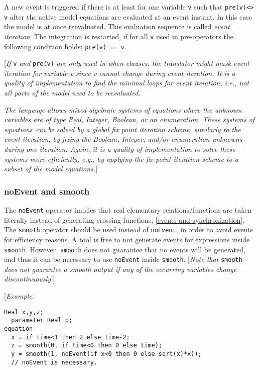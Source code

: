 A new event is triggered if there is at least for one variable \lstinline!v! such that \lstinline!pre(v)<> v! after the active model equations are
evaluated at an event instant. In this case the model is at once
reevaluated. This evaluation sequence is called \emph{event
iteration}. The integration is restarted, if for all \lstinline!v! used in
pre-operators the following condition holds: \lstinline!pre(v) == v!.

{[}\emph{If} \lstinline!v! \emph{and} \lstinline!pre(v)! \emph{are only used in when-clauses,
the translator might mask event iteration for variable v since v cannot
change during event iteration. It is a \emph{quality of implementation} to
find the minimal loops for event iteration, i.e., not all parts of the
model need to be reevaluated. }

\emph{The language allows mixed algebraic systems of equations where the
unknown variables are of type Real, Integer, Boolean, or an enumeration.
These systems of equations can be solved by a global fix point iteration
scheme, similarly to the event iteration, by fixing the Boolean,
Integer, and/or enumeration unknowns during one iteration. Again, it is
a quality of implementation to solve these systems more efficiently,
e.g., by applying the fix point iteration scheme to a subset of the
model equations.}{]}

\subsubsection{noEvent and smooth}

The \lstinline!noEvent! operator implies that real elementary relations/functions
are taken literally instead of generating crossing functions, \autoref{events-and-synchronization}.
The \lstinline!smooth! operator should be used instead of \lstinline!noEvent!, in order to
avoid events for efficiency reasons. A tool is free to not generate
events for expressions inside \lstinline!smooth!. However, \lstinline!smooth! does not guarantee
that no events will be generated, and thus it can be necessary to use
\lstinline!noEvent! inside \lstinline!smooth!. {[}\emph{Note that} \lstinline!smooth! \emph{does not
guarantee a smooth output if any of the occurring variables change
discontinuously.}{]}

{[}\emph{Example}:
\begin{lstlisting}[language=modelica]
  Real x,y,z;
  parameter Real p;
equation
  x = if time<1 then 2 else time-2;
  z = smooth(0, if time<0 then 0 else time);
  y = smooth(1, noEvent(if x<0 then 0 else sqrt(x)*x));
  // noEvent is necessary.
\end{lstlisting}


